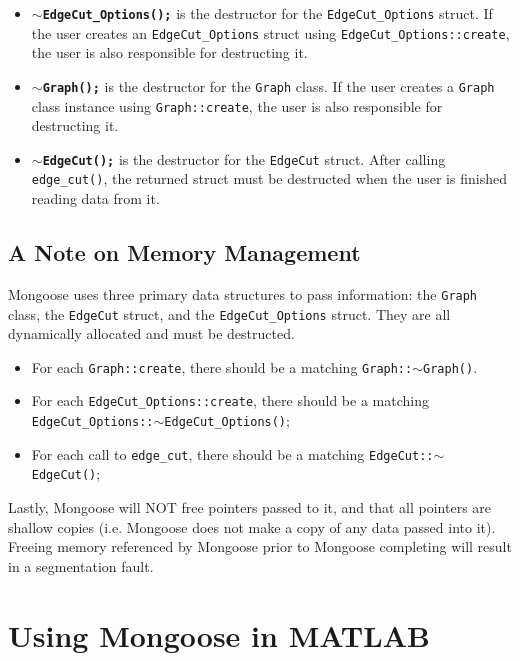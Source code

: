 \documentclass[letter]{article}
\begin{document}
\begin{itemize}
\vspace{6pt}
\item \textbf{\texttt{$\sim$EdgeCut\_Options();}} is the destructor for the \texttt{EdgeCut\_Options} struct. If the user creates an \texttt{EdgeCut\_Options} struct using \texttt{EdgeCut\_Options::create}, the user is also responsible for destructing it.
\item \textbf{\texttt{$\sim$Graph();}} is the destructor for the \texttt{Graph} class. If the user creates a \texttt{Graph} class instance using \texttt{Graph::create}, the user is also responsible for destructing it.
\item \textbf{\texttt{$\sim$EdgeCut();}} is the destructor for the \texttt{EdgeCut} struct. After calling \texttt{edge\_cut()}, the returned struct must be destructed when the user is finished reading data from it.
\end{itemize}

\subsection{A Note on Memory Management}

Mongoose uses three primary data structures to pass information: the \texttt{Graph} class, the \texttt{EdgeCut} struct, and the \texttt{EdgeCut\_Options} struct. They are all dynamically allocated and must be destructed.

\begin{itemize}
\item For each \texttt{Graph::create}, there should be a matching \texttt{Graph::$\sim$Graph()}.
\item For each \texttt{EdgeCut\_Options::create}, there should be a matching \texttt{EdgeCut\_Options::$\sim$EdgeCut\_Options()};
\item For each call to \texttt{edge\_cut}, there should be a matching \texttt{EdgeCut::$\sim$EdgeCut()};
\end{itemize}

Lastly, Mongoose will NOT free pointers passed to it, and that all pointers are shallow copies (i.e. Mongoose does not make a copy of any data passed into it). Freeing memory referenced by Mongoose prior to Mongoose completing will result in a segmentation fault.

\section{Using Mongoose in MATLAB}
\end{document}
